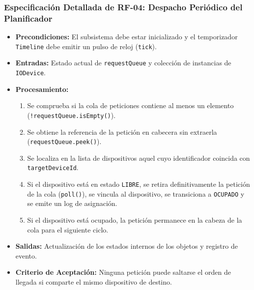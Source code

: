 \documentclass[11pt,letterpaper]{article}
\begin{document}
\subsubsection{Especificación Detallada de RF-04: Despacho Periódico del Planificador}
\begin{itemize}
    \item \textbf{Precondiciones:} El subsistema debe estar inicializado y el temporizador \texttt{Timeline} debe emitir un pulso de reloj (\texttt{tick}).
    \item \textbf{Entradas:} Estado actual de \texttt{requestQueue} y colección de instancias de \texttt{IODevice}.
    \item \textbf{Procesamiento:}
    \begin{enumerate}
        \item Se comprueba si la cola de peticiones contiene al menos un elemento (\texttt{!requestQueue.isEmpty()}).
        \item Se obtiene la referencia de la petición en cabecera sin extraerla (\texttt{requestQueue.peek()}).
        \item Se localiza en la lista de dispositivos aquel cuyo identificador coincida con \texttt{targetDeviceId}.
        \item Si el dispositivo está en estado \texttt{LIBRE}, se retira definitivamente la petición de la cola (\texttt{poll()}), se vincula al dispositivo, se transiciona a \texttt{OCUPADO} y se emite un log de asignación.
        \item Si el dispositivo está ocupado, la petición permanece en la cabeza de la cola para el siguiente ciclo.
    \end{enumerate}
    \item \textbf{Salidas:} Actualización de los estados internos de los objetos y registro de evento.
    \item \textbf{Criterio de Aceptación:} Ninguna petición puede saltarse el orden de llegada si comparte el mismo dispositivo de destino.
\end{itemize}
\end{document}
